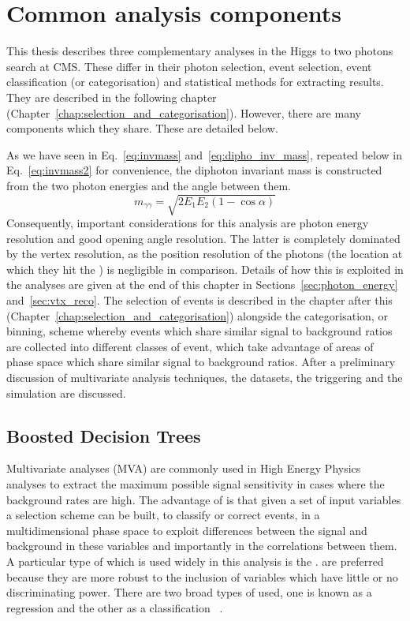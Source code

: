 \chapter{Common analysis components}
\label{chap:common_analysis_components}

This thesis describes three complementary analyses in the Higgs to two photons search at CMS. These differ in their photon selection, event selection, event classification (or categorisation) and statistical methods for extracting results. They are described in the following chapter (Chapter~\ref{chap:selection_and_categorisation}). However, there are many components which they share. These are detailed below.

As we have seen in Eq.~\ref{eq:invmass} and~\ref{eq:dipho_inv_mass}, repeated below in Eq.~\ref{eq:invmass2} for convenience, the diphoton invariant mass is constructed from the two photon energies and the angle between them. 
\begin{equation}
  m_{\gamma\gamma} = \sqrt{2E_{1}E_{2}(1-\cos\alpha)}
  \label{eq:invmass2}
\end{equation}
Consequently, important considerations for this analysis are photon energy resolution and good opening angle resolution. The latter is completely dominated by the vertex resolution, as the position resolution of the photons (the location at which they hit the \ECAL) is negligible in comparison. Details of how this is exploited in the analyses are given at the end of this chapter in Sections~\ref{sec:photon_energy} and~\ref{sec:vtx_reco}. The selection of events is described in the chapter after this (Chapter~\ref{chap:selection_and_categorisation}) alongside the categorisation, or binning, scheme whereby events which share similar signal to background ratios are collected into different classes of event, which take advantage of areas of phase space which share similar signal to background ratios.
After a preliminary discussion of multivariate analysis techniques, the datasets, the triggering and the \MC simulation are discussed.

\section{Boosted Decision Trees}
\label{sec:bdts}
Multivariate analyses (\acs{MVA}) are commonly used in High Energy Physics analyses to extract the maximum possible signal sensitivity in cases where the background rates are high. The advantage of \MVAs is that given a set of input variables a selection scheme can be built, to classify or correct events, in a multidimensional phase space to exploit differences between the signal and background in these variables and importantly in the correlations between them. A particular type of \MVA which is used widely in this analysis is the \BDT. \BDTs are preferred because they are more robust to the inclusion of variables which have little or no discriminating power. There are two broad types of \BDT used, one is known as a regression \BDT and the other as a classification \BDT~\cite{bdt,bdt2,bdt3}. 

